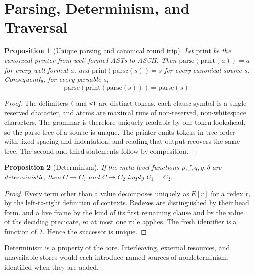 \documentclass[11pt]{article}
\newtheorem{proposition}{Proposition}
\newcommand{\code}[1]{\texttt{#1}}
\newcommand{\step}{\longrightarrow}
\begin{document}
\section{Parsing, Determinism, and Traversal}

\begin{proposition}[Unique parsing and canonical round trip]\label{p:parse}
Let $\mathrm{print}$ be the canonical printer from well-formed ASTs to ASCII. Then $\mathrm{parse}(\mathrm{print}(a))=a$ for every well-formed $a$, and $\mathrm{print}(\mathrm{parse}(s))=s$ for every canonical source $s$. Consequently, for every parsable $s$,
\[\mathrm{parse}(\mathrm{print}(\mathrm{parse}(s)))=\mathrm{parse}(s).\]
\end{proposition}
\begin{proof}
The delimiters \code{(} and \code{<(} are distinct tokens, each clause symbol is a single reserved character, and atoms are maximal runs of non-reserved, non-whitespace characters. The grammar is therefore uniquely readable by one-token lookahead, so the parse tree of a source is unique. The printer emits tokens in tree order with fixed spacing and indentation, and reading that output recovers the same tree. The second and third statements follow by composition.
\end{proof}

\begin{proposition}[Determinism]\label{p:det}
If the meta-level functions $p,f,q,g,\delta$ are deterministic, then $C\step C_1$ and $C\step C_2$ imply $C_1=C_2$.
\end{proposition}
\begin{proof}
Every term other than a value decomposes uniquely as $E[r]$ for a redex $r$, by the left-to-right definition of contexts. Redexes are distinguished by their head form, and a live frame by the kind of its first remaining clause and by the value of the deciding predicate, so at most one rule applies. The fresh identifier is a function of $\lambda$. Hence the successor is unique.
\end{proof}

Determinism is a property of the core. Interleaving, external resources, and unavailable stores would each introduce named sources of nondeterminism, identified when they are added.
\end{document}
